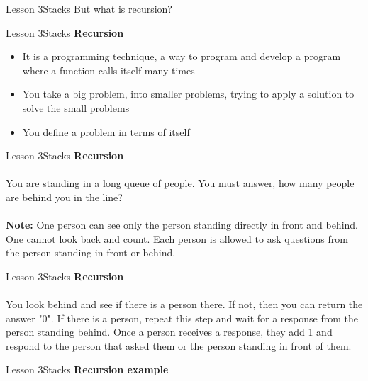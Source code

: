 \documentclass[aspectratio=1610]{beamer}
\begin{document}
\begin{frame}{Lesson 3}{Stacks}
\Huge
 But what is recursion?
\end{frame}


\begin{frame}{Lesson 3}{Stacks}
\LARGE
\textbf{Recursion}\\
\begin{itemize}
    \item It is a programming technique, a way to program and develop a program where a function calls itself many times
    \item You take a big problem, into smaller problems, trying to apply a solution to solve the small problems
    \item You define a problem in terms of itself 
\end{itemize}
\end{frame}


\begin{frame}{Lesson 3}{Stacks}
\LARGE
\textbf{Recursion}\\~\\
You are standing in a long queue of people. You must answer, how many
people are behind you in the line?\\~\\
\large
\textbf{Note:}
One person can see only the person standing directly in front and
behind. One cannot look back and count. Each person is allowed to ask
questions from the person standing in front or behind.
\end{frame}


\begin{frame}{Lesson 3}{Stacks}
\LARGE
\textbf{Recursion}\\~\\
You look behind and see if there is a person there. If not, then you
can return the answer "0". If there is a person, repeat this step and
wait for a response from the person standing behind. Once a person
receives a response, they add 1 and respond to the person that asked
them or the person standing in front of them.
\end{frame}


\begin{frame}{Lesson 3}{Stacks}
\Large
\textbf{Recursion example}\\~\\
\label{personCount}
\begin{algorithmic}[1]
    \State {}
    \State {}    
\EndIf
\EndProcedure
\end{algorithmic}
\end{frame}
\end{document}
